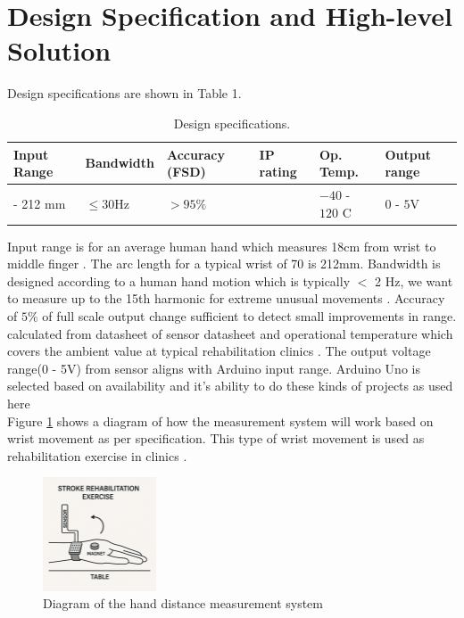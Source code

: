 \documentclass[a4paper,12pt]{article}
\begin{document}
%
\section{Design Specification and High-level Solution}
Design specifications are shown in Table 1. 
\begin{table}[ht]
\centering
\caption{Design specifications.}
\begin{tabular}{|>{\centering\arraybackslash}p{2.2cm}|>{\centering\arraybackslash}p{2.5cm}|>{\centering\arraybackslash}p{2cm}|>{\centering\arraybackslash}p{1.5cm}|>{\centering\arraybackslash}p{2.5cm}|>{\centering\arraybackslash}p{2.5cm}|}
\hline
\textbf{Input Range} & \textbf{Bandwidth} & \textbf{Accuracy (FSD)} & \textbf{IP rating} & \textbf{Op. Temp.} & \textbf{Output range} \\
\hline
0 - 212 mm & $\leq 30 \text{Hz}$ & $>95\%$ & 22 \cite{coutts2025ingress}  & $-40$ - $120$ \textdegree{}C & $0$ - $5 \text{V}$  \\
\hline
\end{tabular}
\end{table}
Input range is for an average human hand which measures 18cm from wrist to middle finger \cite{guerra2014hand}. The arc length for a typical wrist of 70\textdegree{} is 212mm. Bandwidth is designed according to a human hand motion which is typically $<$ 2 Hz, we want to measure up to the 15th harmonic for extreme unusual movements \cite{rohrer2002movement}. Accuracy of $5\%$ of full scale output change sufficient to detect small improvements in range. calculated from datasheet of sensor datasheet and operational temperature which covers the ambient value at typical rehabilitation clinics \cite{primex2023}. The output voltage range(0 - 5V) from sensor aligns with Arduino input range. Arduino Uno is selected based on availability and it's ability to do these kinds of projects as used here \cite{wiyono2021simulation}\\
Figure \ref{fig:measure_diag} shows a diagram of how the measurement system will work based on wrist movement as per specification. This type of wrist movement is used as rehabilitation exercise in clinics \cite{yuzer2017randomized}.
\begin{figure}[!ht]
    \centering
    \includegraphics[width=0.3\textwidth]{diagram-Measure.png}
    \caption{Diagram of the hand distance measurement system}
    \label{fig:measure_diag}
\end{figure}
\end{document}
